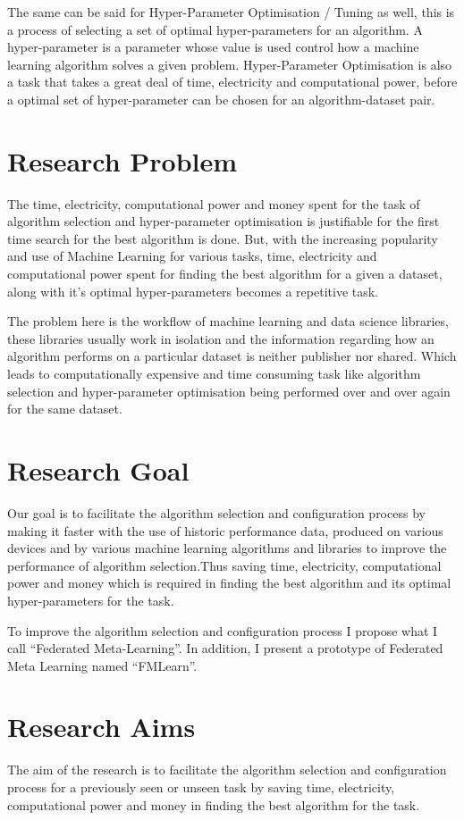 The same can be said for Hyper-Parameter Optimisation / Tuning as well, this is a process of selecting a set of optimal hyper-parameters for an algorithm. A hyper-parameter is a parameter whose value is used control how a machine learning algorithm solves a given problem. Hyper-Parameter Optimisation is also a task that takes a great deal of time, electricity and computational power, before a optimal set of hyper-parameter can be chosen for an algorithm-dataset pair.

\section{Research Problem}
The time, electricity, computational power and money spent for the task of algorithm selection and hyper-parameter optimisation is justifiable for the first time search for the best algorithm is done. But, with the increasing popularity and use of Machine Learning for various tasks, time, electricity and computational power spent for finding the best algorithm for a given a dataset, along with it's optimal hyper-parameters becomes a repetitive task.

The problem here is the workflow of machine learning and data science libraries, these libraries usually work in isolation and the information regarding how an algorithm performs on a particular dataset is neither publisher nor shared. Which leads to computationally expensive and time consuming task like algorithm selection and hyper-parameter optimisation being performed over and over again for the same dataset.

\section{Research Goal}
Our goal is to facilitate the algorithm selection and configuration process by making it faster with the use of historic performance data, produced on various devices and by various machine learning algorithms and libraries to improve the performance of algorithm selection.Thus saving time, electricity, computational power and money which is required in finding the best algorithm and its optimal hyper-parameters for the task.

To improve the algorithm selection and configuration process I propose what I call “Federated Meta-Learning”. In addition, I present a prototype of Federated Meta Learning named “FMLearn”.

\section{Research Aims}
The aim of the research is to facilitate the algorithm selection and configuration process for a previously seen or unseen task by saving time, electricity, computational power and money in finding the best algorithm for the task. 


